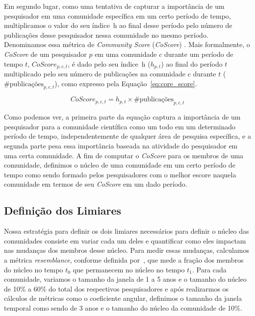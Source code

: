 \documentclass[12pt]{article}
\begin{document}
Em segundo lugar, como uma tentativa de capturar a importância de um pesquisador em uma comunidade 
específica em um certo período de tempo, multiplicamos o valor do seu índice~h 
ao final desse período pelo número de publicações desse pesquisador nessa comunidade 
no mesmo período. Denominamos essa métrica de \textit{Community Score} (\textit{CoScore}) \cite{Alves2013}. 
Mais formalmente, o \textit{CoScore} de um pesquisador $p$ em uma 
comunidade $c$ durante um período de tempo $t$, $\textit{CoScore}_{p,c,t}$, é dado 
pelo seu índice~h ($h_{p,t}$) ao final do período $t$ multiplicado pelo 
seu número de publicações na comunidade $c$ durante $t$ ($\textrm{\#}\text{publicações}_{p,c,t}$),
como expresso pela Equação~\ref{eq:core_score}.

\begin{equation}
  \label{eq:core_score}
  \textit{CoScore}_{p,c,t} = h_{p,t} \times \textrm{\#}\text{publicações}_{p,c,t}
\end{equation}

Como podemos ver, a primeira parte da equação captura a importância de um pesquisador para 
a comunidade científica como um todo em um determinado período de tempo, independentemente 
de qualquer área de pesquisa específica, e a segunda parte pesa essa importância baseada na 
atividade do pesquisador em uma certa comunidade. A fim de computar o \textit{CoScore} para 
os membros de uma comunidade, definimos o núcleo de uma comunidade em um certo período de tempo 
como sendo formado pelos pesquisadores com o melhor escore naquela comunidade em termos de 
seu \textit{CoScore} em um dado período. 

\subsection{Definição dos Limiares}

Nossa estratégia para definir os dois limiares necessários para definir o núcleo das 
comunidades consiste em variar cada um deles e quantificar como eles impactam nas 
mudanças dos membros desse núcleo. Para medir essas mudanças, calculamos a
métrica \textit{resemblance}, conforme definida por~\cite{Viswanath2009}, que mede a 
fração dos membros do núcleo no tempo $t_0$ que permanecem no núcleo no tempo $t_1$.
Para cada comunidade, variamos o tamanho da janela de 1 a 5 anos e o tamanho do 
núcleo de 10\% a 60\% do total dos respectivos pesquisadores e após realizarmos os
cálculos de métricas como o coeficiente angular, definimos o tamanho da janela temporal
como sendo de 3 anos e o tamanho do núcleo da comunidade de 10\%.
\end{document}
